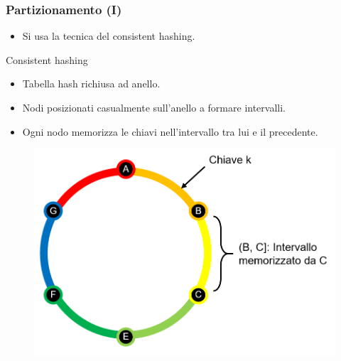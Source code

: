 \begin{frame}
  \frametitle{Partizionamento (I)}
  \begin{itemize}
  \item Si usa la tecnica del \alert{consistent hashing}.
  \end{itemize}
  \begin{block}{Consistent hashing}
    \begin{itemize}
    \item Tabella hash richiusa ad anello.
    \item Nodi posizionati casualmente sull'anello a formare intervalli.
    \item Ogni nodo memorizza le chiavi nell'intervallo tra lui e il precedente.
    \end{itemize}
  \end{block}
  \begin{figure}
  \centering
  \includegraphics[scale=0.25]{dynamo/consistent-hashing-ring.png}
  \end{figure}
\end{frame}


